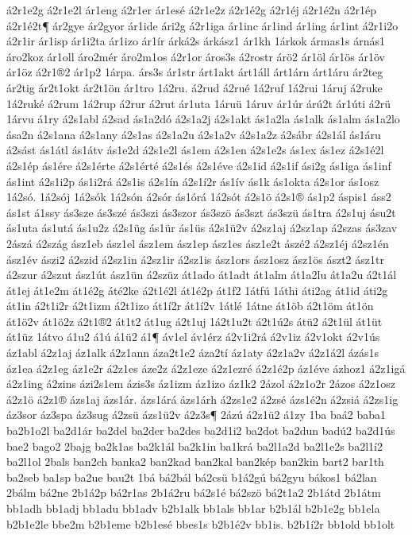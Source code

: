 {á2r1e2g
á2r1e2l
ár1eng
á2r1er
ár1esé
á2r1e2z
á2r1é2g
á2r1éj
á2r1é2n
á2r1ép
á2r1é2t¶
ár2gye
ár2gyor
ár1ide
ári2g
á2r1iga
ár1inc
ár1ind
ár1ing
ár1int
á2r1i2o
á2r1ir
ár1isp
ár1i2ta
ár1izo
ár1ír
árká2s
árkász1
ár1kh
1árkok
ármas1s
árnás1
áro2koz
ár1oll
áro2mér
áro2m1os
á2r1or
áros3s
á2rostr
árö2
ár1öl
ár1ös
ár1öv
ár1öz
á2r1®2
ár1p2
1árpa.
árs3s
ár1str
árt1akt
árt1áll
árt1árn
árt1áru
ár2teg
ár2tig
ár2t1okt
ár2t1ön
ár1tro
1á2ru.
á2rud
á2rué
1á2ruf
1á2rui
1áruj
á2ruke
1á2ruké
á2rum
1á2rup
á2rur
á2rut
ár1uta
1áruü
1áruv
ár1úr
árú2t
ár1úti
á2rü
1árvu
á1ry
á2s1abl
á2sad
ás1a2dó
á2s1a2j
á2s1akt
ás1a2la
ás1alk
ás1alm
ás1a2lo
ása2n
á2s1ana
á2s1any
á2s1as
á2s1a2u
á2s1a2v
á2s1a2z
á2sábr
á2s1ál
ás1áru
á2sást
ás1átl
ás1átv
ás1e2d
á2s1e2l
ás1em
á2s1en
á2s1e2s
ás1ex
ás1ez
á2s1é2l
á2s1ép
ás1ére
á2s1érte
á2s1érté
á2s1és
á2s1éve
á2s1id
á2s1if
ási2g
ás1iga
ás1inf
ás1int
á2s1i2p
ás1i2rá
á2s1is
á2s1ín
á2s1í2r
ás1ív
ás1k
ás1okta
á2s1or
ás1osz
1á2só.
1á2sój
1á2sók
1á2són
á2sór
ás1órá
1á2sót
á2s1ö
á2s1®
ás1p2
áspis1
áss2
ás1st
á1ssy
ás3sze
ás3szé
ás3szi
ás3szor
ás3szö
ás3szt
ás3szü
ás1tra
á2s1uj
ásu2t
ás1uta
ás1utá
ás1u2z
á2s1üg
ás1ür
ás1üs
á2s1ü2v
á2sz1aj
á2sz1ap
á2szas
ás3zav
2ászá
á2szág
ász1eb
ász1el
ász1em
ász1ep
ász1es
ász1e2t
ászé2
á2sz1éj
á2sz1én
ász1év
ászi2
á2szid
á2sz1in
á2sz1ir
á2sz1is
ász1ors
ász1osz
ász1ös
ászt2
ász1tr
á2szur
á2szut
ász1út
ász1ün
á2szüz
át1ado
át1adt
át1alm
át1a2lu
át1a2u
á2t1ál
át1ej
át1e2m
át1é2g
áté2ke
á2t1é2l
át1é2p
át1f2
1átfú
1áthi
áti2ag
át1id
áti2g
át1in
á2t1i2r
á2t1izm
á2t1izo
át1í2r
át1í2v
1átlé
1átne
át1öb
á2t1öm
át1ön
át1ö2v
át1ö2z
á2t1®2
át1t2
át1ug
á2t1uj
1á2t1u2t
á2t1ú2s
átü2
á2t1ül
át1üt
át1üz
1átvo
á1u2
á1ú
á1ü2
á1¶
áv1el
áv1érz
á2v1i2rá
á2v1iz
á2v1okt
á2v1ús
áz1abl
á2z1aj
áz1alk
á2z1ann
áza2t1e2
áza2tí
áz1aty
á2z1a2v
á2z1á2l
ázás1s
áz1ea
á2z1eg
áz1e2r
á2z1es
áze2z
á2z1eze
á2z1ezré
á2z1é2p
áz1éve
ázhoz1
á2z1igá
á2z1ing
á2zins
ázi2s1em
ázis3s
áz1izm
áz1izo
áz1k2
2ázol
á2z1o2r
2ázos
á2z1osz
á2z1ö
á2z1®
ázs1aj
ázs1ár.
ázs1árá
ázs1árh
á2zs1e2
á2zsé
ázs1é2n
á2zsiá
á2zs1ig
áz3sor
áz3spa
áz3sug
á2zsü
ázs1ü2v
á2z3s¶
2ázú
á2z1ü2
á1zy
1ba
baá2
baba1
ba2b1o2l
ba2d1ár
ba2del
ba2der
ba2des
ba2d1i2
ba2dot
ba2dun
badú2
ba2d1ús
bae2
bago2
2bajg
ba2k1as
ba2k1ál
ba2k1in
ba1krá
ba2l1a2d
ba2l1e2s
ba2l1í2
ba2l1ol
2bals
ban2ch
banka2
ban2kad
ban2kal
ban2kép
ban2kin
bart2
bar1th
ba2seb
ba1sp
ba2ue
bau2t
1bá
bá2bál
bá2csü
b1á2gú
bá2gyu
bákos1
bá2lan
2bálm
bá2ne
2b1á2p
bá2r1as
2b1á2ru
bá2s1é
bá2szö
bá2t1a2
2b1átd
2b1átm
bb1adh
bb1adj
bb1adu
bb1adv
b2b1alk
bb1als
bb1ar
b2b1ál
b2b1e2g
bb1ela
b2b1e2le
bbe2m
b2b1eme
b2b1esé
bbes1s
b2b1é2v
bb1is.
b2b1í2r
bb1old
bb1olt
}
